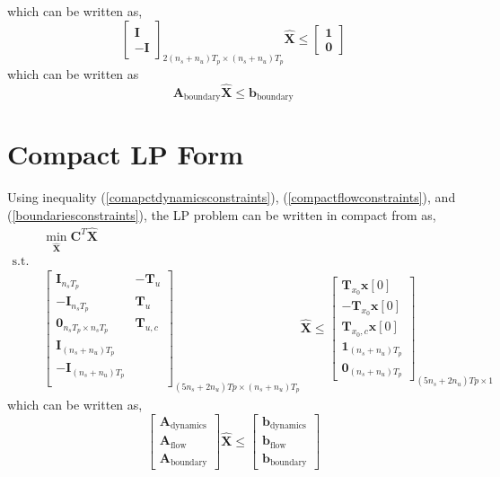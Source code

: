 \documentclass{article}
\begin{document}
which can be written as,
\begin{equation}
\label{boundariesconstraints}
\begin{bmatrix}
\mathbf{I}\\
-\mathbf{I}
\end{bmatrix}_{2 (n_s+n_u)T_p \times (n_s+n_u)T_p}
\hat{\mathbf{X}} \leq
\begin{bmatrix}
\mathbf{1}\\ \mathbf{0}
\end{bmatrix}
\end{equation}
which can be written as
\[
\mathbf{A}_{\text{boundary}} \hat{\mathbf{X}} \leq \mathbf{b}_{\text{boundary}}
\]

\section{Compact LP Form}
Using inequality (\ref{comapctdynamicsconstraints}), (\ref{compactflowconstraints}), and (\ref{boundariesconstraints}), the LP problem can be written in compact from as,
\begin{equation}
\begin{aligned}
&\min_{\hat{\mathbf{X}}} \mathbf{C}^T \hat{\mathbf{X}} \\
\text{s.t.} \;  \\
&
\begin{bmatrix}
\mathbf{I}_{n_s T_p} & -\mathbf{T}_u\\
-\mathbf{I}_{n_s T_p} & \mathbf{T}_u\\
\mathbf{0}_{n_s T_p \times n_s T_p} & \mathbf{T}_{u,c} \\
\mathbf{I}_{(n_s+n_u)T_p}\\
-\mathbf{I}_{(n_s+n_u)T_p}\\
\end{bmatrix}_{(5n_s+2n_u)Tp \times (n_s+n_u)T_p} \hat{\mathbf{X}}
\leq
\begin{bmatrix}
\mathbf{T}_{x_0}\mathbf{x}[0]\\
-\mathbf{T}_{x_0}\mathbf{x}[0]\\
\mathbf{T}_{x_0,c} \mathbf{x}[0]\\
\mathbf{1}_{(n_s+n_u)T_p}\\
\mathbf{0}_{(n_s+n_u)T_p}
\end{bmatrix}_{(5n_s+2n_u)Tp \times 1}
\end{aligned}
\end{equation}
which can be written as,
\begin{equation}
\begin{bmatrix}
\mathbf{A}_{\text{dynamics}}\\
\mathbf{A}_{\text{flow}}\\
\mathbf{A}_{\text{boundary}}
\end{bmatrix}
\hat{\mathbf{X}}
\leq 
\begin{bmatrix}
\mathbf{b}_{\text{dynamics}}\\
\mathbf{b}_{\text{flow}}\\
\mathbf{b}_{\text{boundary}}
\end{bmatrix}
\end{equation}
%
\end{document}
